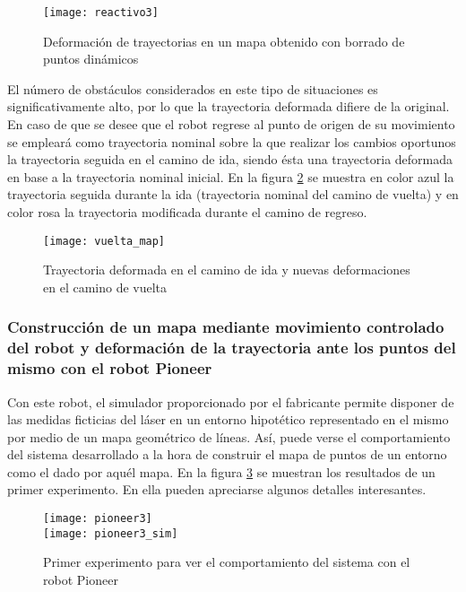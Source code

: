 \begin{figure}[h]
  \centering\texttt{[image: reactivo3]}\\
  \caption{Deformación de trayectorias en un mapa obtenido con borrado de puntos dinámicos}\label{fg:react3}
\end{figure}

El número de obstáculos considerados en este tipo de situaciones es significativamente alto, por lo que la trayectoria deformada difiere de la original. En caso de que se desee que el robot regrese al punto de origen de su movimiento se empleará como trayectoria nominal sobre la que realizar los cambios oportunos la trayectoria seguida en el camino de ida, siendo ésta una trayectoria deformada en base a la trayectoria nominal inicial. En la figura \ref{fg:vuelta_map} se muestra en color azul la trayectoria seguida durante la ida (trayectoria nominal del camino de vuelta) y en color rosa la trayectoria modificada durante el camino de regreso.

\begin{figure}[h]
  \centering\texttt{[image: vuelta\_map]}\\
  \caption{Trayectoria deformada en el camino de ida y nuevas deformaciones en el camino de vuelta}\label{fg:vuelta_map}
\end{figure} 

\subsubsection{Construcción de un mapa mediante movimiento controlado del robot y deformación de la trayectoria ante los puntos del mismo con el robot Pioneer}

Con este robot, el simulador proporcionado por el fabricante permite disponer de las medidas ficticias del láser en un entorno hipotético representado en el mismo por medio de un mapa geométrico de líneas. Así, puede verse el comportamiento del sistema desarrollado a la hora de construir el mapa de puntos de un entorno como el dado por aquél mapa. En la  figura \ref{fg:pioneerSim1} se muestran los resultados de un primer experimento. En ella pueden apreciarse algunos detalles interesantes. 
\begin{figure}[h]
  \centering\texttt{[image: pioneer3]}\\
  \hspace{0.5cm}\texttt{[image: pioneer3\_sim]}
  \caption{Primer experimento para ver el comportamiento del sistema con el robot Pioneer}\label{fg:pioneerSim1}
\end{figure}
 
